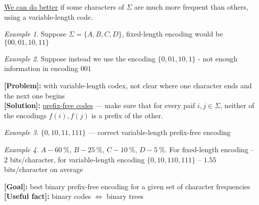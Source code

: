 \documentclass[a4paper,12pt]{article}
\theoremstyle{plain}
\theoremstyle{definition}
\theoremstyle{remark}
\newtheorem*{example}{Example}
\begin{document}
\underline{We can do better} if some characters of $\Sigma$ are much more frequent than others, using a variable-length code.
\\

\begin{example}Suppose $\Sigma = \{A, B, C, D\}$, fixed-length encoding would be $\{00, 01, 10, 11\}$\end{example}
\begin{example}Suppose instead we use the encoding $\{0, 01, 10, 1\}$ - not enough information in encoding $001$\end{example}

\textbf{[Problem]:} with variable-length codex, not clear where one character ends and the next one begins
\\

\textbf{[Solution]:} \underline{prefix-free codes} --- make sure that for every paif $i, j \in \Sigma$, neither of the encodings $f(i), f(j)$ is a prefix of the other.
\\

\begin{example}$\{0, 10, 11, 111\}$ --- correct variable-length prefix-free encoding\end{example}
\begin{example}$A - 60~\%$, $B - 25~\%$, $C - 10~\%$, $D - 5~\%$. For fixed-length encoding -- $2$ bits/character, for variable-length encoding $\{{0, 10, 110, 111}\}$ -- $1.55$ bits/character on average\end{example}

\textbf{[Goal]:} best binary prefix-free encoding for a given set of character frequencies
\\

\textbf{[Useful fact]:} binary codes $\iff$ binary trees
\\
\end{document}
